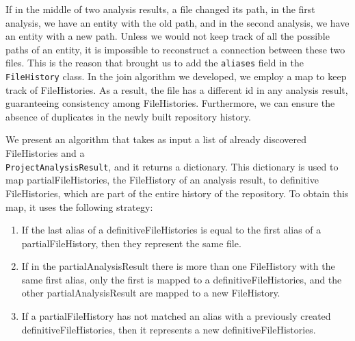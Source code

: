 If in the middle of two analysis results, a file changed its path, in the first analysis, we have an entity with the old path, 
and in the second analysis, we have an entity with a new path. 
Unless we would not keep track of all the possible paths of an entity, it is impossible to reconstruct a connection between these two files. 
This is the reason that brought us to add the \texttt{aliases} field in the \texttt{FileHistory} class. 
In the join algorithm we developed, we employ a map to keep track of FileHistories.
As a result, the file has a different id in any analysis result, guaranteeing consistency among FileHistories. Furthermore, we can ensure the absence of duplicates in the newly built repository history. 

We present an algorithm that takes as input a list of already discovered FileHistories and a \\ \texttt{ProjectAnalysisResult}, and it returns a dictionary.
This dictionary is used to map partialFileHistories, the FileHistory of an analysis result, to definitive FileHistories, which are part of the entire history of the repository. 
To obtain this map, it uses the following strategy:
\begin{enumerate}
    \item If the last alias of a definitiveFileHistories is equal to the first alias of a partialFileHistory, then they represent the same file.
    \item If in the partialAnalysisResult there is more than one FileHistory with the same first alias, only the first is mapped to a definitiveFileHistories, and the other partialAnalysisResult are mapped to a new FileHistory.
    \item If a partialFileHistory has not matched an alias with a previously created definitiveFileHistories, then it represents a new definitiveFileHistories.
\end{enumerate}

